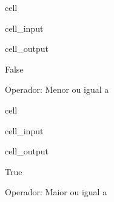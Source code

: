 \documentclass[letterpaper,10pt,english]{jupyterBook}
\begin{document}
\begin{sphinxuseclass}{cell}\begin{sphinxVerbatimInput}

\begin{sphinxuseclass}{cell_input}
\begin{sphinxVerbatim}[commandchars=\\\{\}]
\end{sphinxVerbatim}

\end{sphinxuseclass}\end{sphinxVerbatimInput}
\begin{sphinxVerbatimOutput}

\begin{sphinxuseclass}{cell_output}
\begin{sphinxVerbatim}[commandchars=\\\{\}]
False
\end{sphinxVerbatim}

\end{sphinxuseclass}\end{sphinxVerbatimOutput}

\end{sphinxuseclass}
\sphinxAtStartPar
Operador: Menor ou igual a

\begin{sphinxuseclass}{cell}\begin{sphinxVerbatimInput}

\begin{sphinxuseclass}{cell_input}
\begin{sphinxVerbatim}[commandchars=\\\{\}]
\end{sphinxVerbatim}

\end{sphinxuseclass}\end{sphinxVerbatimInput}
\begin{sphinxVerbatimOutput}

\begin{sphinxuseclass}{cell_output}
\begin{sphinxVerbatim}[commandchars=\\\{\}]
True
\end{sphinxVerbatim}

\end{sphinxuseclass}\end{sphinxVerbatimOutput}

\end{sphinxuseclass}
\sphinxAtStartPar
Operador: Maior ou igual a
\end{document}
